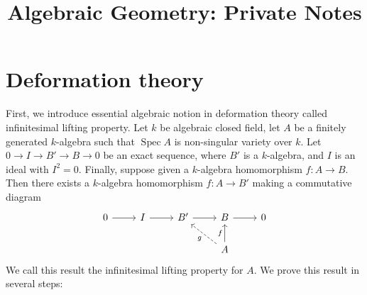 \documentclass[a4paper,12pt]{amsart}
\title{Algebraic Geometry: Private Notes}
\theoremstyle{definition}
\theoremstyle{plain}
\DeclareMathOperator{\spec}{Spec}
\begin{document}
	\maketitle
\section{Deformation theory}
First, we introduce essential algebraic notion in deformation theory called infinitesimal lifting property.
	Let $k$ be algebraic closed field, let $A$ be a finitely generated $k$-algebra such that $\spec A$ is non-singular variety over $k$. Let $0 \to I \to B' \to B \to 0$ be an exact sequence, where $B'$ is a $k$-algebra, and $I$ is an ideal with $I^2=0$. Finally, suppose given a $k$-algebra homomorphism $f \colon A \to B$. Then there exists a $k$-algebra homomorphism $f \colon A \to B'$ making a commutative diagram
	\[
	\begin{tikzcd}
		0 \ar[r] &I \ar[r]& B' \ar[r] & B \ar[r]&  0\\
		  & & & A \ar[lu,"g",dashed] \ar[u,"f"]& 
	\end{tikzcd}
	\]
	We call this result the infinitesimal lifting property for $A$. We prove this result in several steps:
\end{document}
